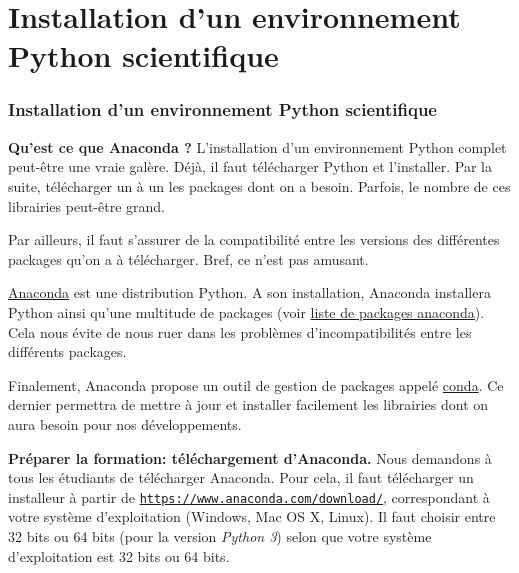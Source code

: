 \documentclass{beamer}
\begin{document}
\section{Installation d'un environnement Python scientifique}

\begin{frame}
\frametitle{Installation d'un environnement Python scientifique}




\noindent\textbf{Qu’est ce que Anaconda ?}
L’installation d’un environnement Python complet peut-être une vraie galère. Déjà, il faut télécharger Python et l’installer. Par la suite, télécharger un à un les packages dont on a besoin. Parfois, le nombre de ces librairies peut-être grand.

Par ailleurs, il faut s’assurer de la compatibilité entre les versions des différentes packages qu’on a à télécharger. Bref, ce n’est pas amusant.


\end{frame}

\begin{frame}

\href{{https://www.anaconda.com/download/}}{Anaconda} est  une distribution Python. A son installation, Anaconda installera Python ainsi qu'une multitude de packages (voir \href{{https://docs.anaconda.com/anaconda/packages/pkg-docs#python-3-6}}{liste de packages anaconda}).  Cela nous évite de nous ruer dans les problèmes d’incompatibilités entre les différents packages.

Finalement, Anaconda propose un outil de gestion de packages appelé \href{{https://conda.io/docs/}}{conda}. Ce dernier permettra de mettre à jour et installer facilement les librairies dont on aura besoin pour nos développements.
\end{frame}

\begin{frame}

\noindent\textbf{Préparer la formation: téléchargement d’Anaconda.}
Nous demandons à tous les étudiants de télécharger Anaconda. Pour cela, il faut télécharger un installeur à partir de \href{{https://www.anaconda.com/download/}}{\nolinkurl{https://www.anaconda.com/download/}}, correspondant à votre système d’exploitation (Windows, Mac OS X, Linux). Il faut choisir entre 32 bits ou 64 bits (pour la version \emph{Python 3}) selon que votre système d’exploitation est 32 bits ou 64 bits.
\end{frame}
\end{document}
